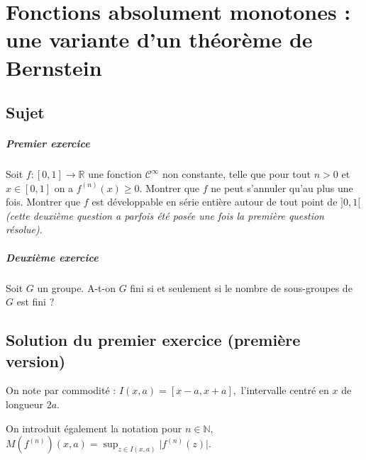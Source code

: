 \chapter{Fonctions absolument monotones : une variante d'un théorème de Bernstein}

\section{Sujet}


\paragraph{Premier exercice}
Soit $f : [0, 1] \rightarrow  \mathbb{R}$ une fonction $\mathcal{C}^{\infty }$ non constante, telle que pour tout $n > 0$ et $x \in [0, 1]$ on a $f^{(n)}(x) \geqslant  0$. Montrer que $f$ ne peut s'annuler qu'au plus une fois. Montrer que $f$ est développable en série entière autour de tout point de $]0, 1[$ \emph{(cette deuxième question a parfois été posée une fois la première question résolue)}.

\paragraph{Deuxième exercice}
Soit $G$ un groupe. A-t-on $G$ fini si et seulement si le nombre de sous-groupes de $G$ est fini ?

\section{Solution du premier exercice (première version)} %

On note par commodité : $\displaystyle I(x,a)=[x-a,x+a],$ l'intervalle centré en $x$ de longueur $2a.$

On introduit également la notation pour $n\in \mathbb{N},$ $\displaystyle M(f^{(n)})(x,a)=\sup_{z\in I(x,a)}\vert f^{(n)}(z)\vert.$

